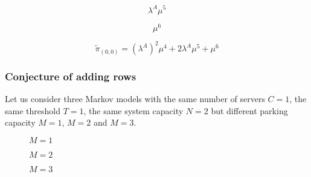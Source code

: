\begin{multicols}{4}
    \begin{figure}[H]
        \centering
        \scalebox{0.6}{}
    \end{figure}
    \vspace*{\fill}
    \columnbreak
    \vspace*{0.3cm}
    \begin{equation*}
        \lambda^A \mu^5
    \end{equation*}
    \vspace*{\fill}
    \columnbreak
    \begin{figure}[H]
        \centering
        \scalebox{0.6}{}
    \end{figure}
    \vspace*{\fill}
    \columnbreak
    \vspace*{0.3cm}
    \begin{equation*}
        \mu^6
    \end{equation*}
\end{multicols}


\begin{equation*}
    \tilde{\pi}_{(0,0)} = (\lambda^A)^2 \mu^4 + 2 \lambda^A \mu^5 + \mu^6
\end{equation*}

\newpage
\subsubsection{Conjecture of adding rows}

Let us consider three Markov models with the same number of servers \(C=1\), the same threshold \(T=1\), the same system capacity \(N=2\) but different parking capacity \(M=1\), \(M=2\) and \(M=3\).


\begin{multicols}{3}
    \begin{figure}[H]
        \centering
        \scalebox{0.8}{}
        \caption{\(M=1\)}
    \end{figure}
    \columnbreak
    \begin{figure}[H]
        \centering
        \scalebox{0.8}{}
        \caption{\(M=2\)}
    \end{figure}
    \begin{figure}[H]
        \centering
        \scalebox{0.8}{}
        \caption{\(M=3\)}
    \end{figure}
\end{multicols}

